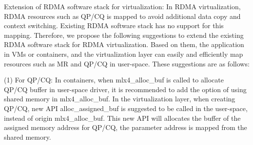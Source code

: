 
Extension of RDMA software stack for virtualization: In RDMA virtualization, RDMA resources such as QP/CQ is mapped to avoid additional data copy and context switching. Existing RDMA software stack has no support for this mapping. Therefore, we propose the following suggestions to extend the existing RDMA software stack for RDMA virtualization. Based on them, the application in VMs or containers, and the virtualization layer can easily and efficiently map resources such as MR and QP/CQ in user-space. These suggestions are as follows:


(1) For QP/CQ: In containers, when mlx4\_alloc\_buf is called to allocate QP/CQ buffer in user-space driver, it is recommended to add the option of using shared memory in mlx4\_alloc\_buf. In the virtualization layer, when creating QP/CQ, new API alloc\_assigned\_buf is suggested to be called in the user-space, instead of origin  mlx4\_alloc\_buf. This new API will allocates the buffer of the assigned memory address for QP/CQ, the parameter address is mapped from the shared memory.


